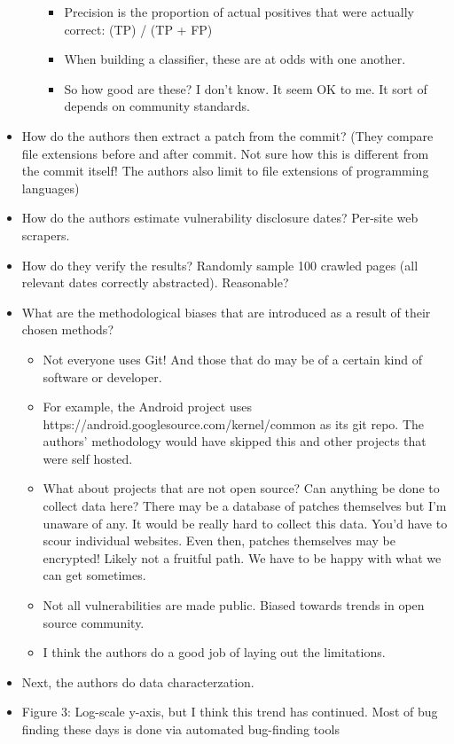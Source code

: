 \documentclass[11pt]{article}
\begin{document}
\begin{itemize}
\begin{enumerate}
\begin{itemize}
            \item Precision is the proportion of actual positives that were actually correct: (TP) / (TP + FP)
            \item When building a classifier, these are at odds with one another. 
            \item So how good are these? I don't know. It seem OK to me. It sort of depends on community standards. 
        \end{itemize}
    \end{enumerate}
    \item How do the authors then extract a patch from the commit? (They compare file extensions before and after commit. Not sure how this is different from the commit itself! The authors also limit to file extensions of programming languages)
    \item How do the authors estimate vulnerability disclosure dates? Per-site web scrapers.
    \item How do they verify the results? Randomly sample 100 crawled pages (all relevant dates correctly abstracted). Reasonable?
    \item What are the methodological biases that are introduced as a result of their chosen methods?
    \begin{itemize}
        \item Not everyone uses Git! And those that do may be of a certain kind of software or developer.
        \item For example, the Android project uses https://android.googlesource.com/kernel/common as its git repo. The authors' methodology would have skipped this and other projects that were self hosted. 
        \item What about projects that are not open source? Can anything be done to collect data here? There may be a database of patches themselves but I'm unaware of any. It would be really hard to collect this data. You'd have to scour individual websites. Even then, patches themselves may be encrypted! Likely not a fruitful path. We have to be happy with what we can get sometimes.
        \item Not all vulnerabilities are made public. Biased towards trends in open source community.
        \item I think the authors do a good job of laying out the limitations.
    \end{itemize}
    \item Next, the authors do data characterzation.
    \item Figure 3: Log-scale y-axis, but I think this trend has continued. Most of bug finding these days is done via automated bug-finding tools

\end{itemize}
\end{document}
